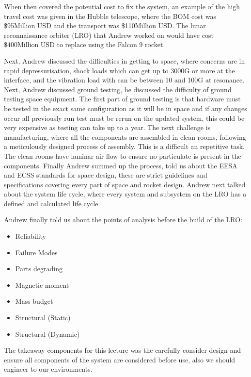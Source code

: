 \documentclass{article}
\begin{document}
When then covered the potential cost to fix the system, an example of the high travel cost was given
in the Hubble telescope, where the BOM cost was \$95Million USD and the transport was \$110Million
USD. The lunar reconnaissance orbiter (LRO) that Andrew worked on would have cost \$400Million USD
to replace using the Falcon 9 rocket.

Next, Andrew discussed the difficulties in getting to space, where concerns are in rapid
depressurisation, shock loads which can get up to 3000G or more at the interface, and the vibration
load with can be between 10 and 100G at resonance. Next, Andrew discussed ground testing, he
discussed the difficulty of ground testing space equipment. The first part of ground testing is that
hardware must be tested in the exact same configuration as it will be in space and if any changes
occur all previously run test must be rerun on the updated system, this could be very expensive as
testing can take up to a year. The next challenge is manufacturing, where all the
components are assembled in clean rooms, following a meticulously designed process of assembly. This
is a difficult an repetitive task. The clean rooms have laminar air flow to ensure no particulate is
present in the components. Finally Andrew summed up the process, told us about the EESA and ECSS
standards for space design, these are strict guidelines and specifications covering every part of space and rocket
design. Andrew next talked about the system life cycle, where every system and subsystem on the LRO
has a defined and calculated life cycle.

Andrew finally told us about the points of analysis before the build of the LRO:

\begin{itemize}

    \item{Reliability}

    \item{Failure Modes}

    \item{Parts degrading}

    \item{Magnetic moment}
    
    \item{Mass budget}

    \item{Structural (Static)}

    \item{Structural (Dynamic)}
    
\end{itemize}

The takeaway components for this lecture was the carefully consider design and ensure all components
of the system are considered before use, also we should engineer to our environments.
\end{document}
